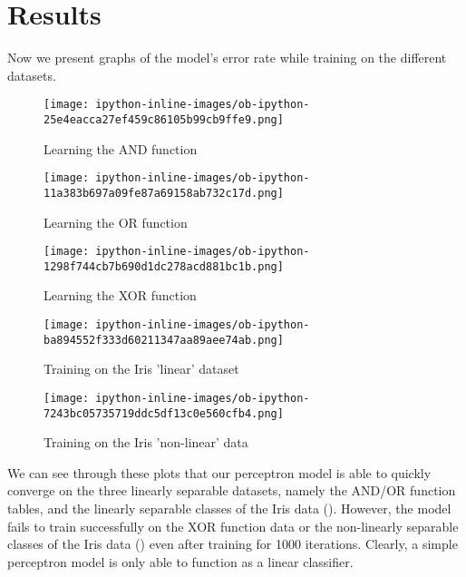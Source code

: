 \documentclass[11pt,a4paper]{article}
\begin{document}
\section{Results}
\label{sec:org7016343}

Now we present graphs of the model's error rate while training on the different datasets.

\begin{figure}[htbp]
\centering
\texttt{[image: ipython-inline-images/ob-ipython-25e4eacca27ef459c86105b99cb9ffe9.png]}
\caption{\label{fig-1}
Learning the AND function}
\end{figure}


\begin{figure}[htbp]
\centering
\texttt{[image: ipython-inline-images/ob-ipython-11a383b697a09fe87a69158ab732c17d.png]}
\caption{\label{fig-2}
Learning the OR function}
\end{figure}


\begin{figure}[htbp]
\centering
\texttt{[image: ipython-inline-images/ob-ipython-1298f744cb7b690d1dc278acd881bc1b.png]}
\caption{\label{fig-3}
Learning the XOR function}
\end{figure}

\begin{figure}[htbp]
\centering
\texttt{[image: ipython-inline-images/ob-ipython-ba894552f333d60211347aa89aee74ab.png]}
\caption{\label{fig-4}
Training on the Iris 'linear' dataset}
\end{figure}

\begin{figure}[htbp]
\centering
\texttt{[image: ipython-inline-images/ob-ipython-7243bc05735719ddc5df13c0e560cfb4.png]}
\caption{\label{fig-5}
Training on the Iris 'non-linear' data}
\end{figure}


We can see through these plots that our perceptron model is able to quickly converge on the three linearly separable datasets, namely the AND/OR function tables, and the linearly separable classes of the Iris data (). However, the model fails to train successfully on the XOR function data or the non-linearly separable classes of the Iris data () even after training for 1000 iterations. Clearly, a simple perceptron model is only able to function as a linear classifier.



\end{document}
